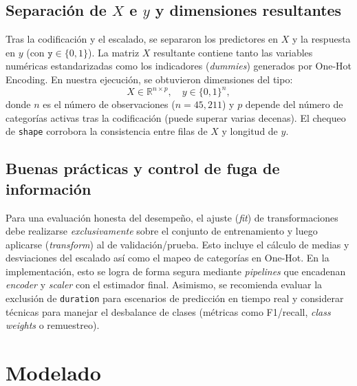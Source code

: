 \documentclass[10pt]{article}
\begin{document}
\subsection*{Separación de \(X\) e \(y\) y dimensiones resultantes}
Tras la codificación y el escalado, se separaron los predictores en \(X\) y la respuesta en \(y\) (con \(\texttt{y}\in\{0,1\}\)). La matriz \(X\) resultante contiene tanto las variables numéricas estandarizadas como los indicadores (\emph{dummies}) generados por One-Hot Encoding. En nuestra ejecución, se obtuvieron dimensiones del tipo:
\[
X \in \mathbb{R}^{n \times p},\quad y \in \{0,1\}^{n},
\]
donde \(n\) es el número de observaciones (\(n=45{,}211\)) y \(p\) depende del número de categorías activas tras la codificación (puede superar varias decenas). El chequeo de \texttt{shape} corrobora la consistencia entre filas de \(X\) y longitud de \(y\).

\subsection*{Buenas prácticas y control de fuga de información}
Para una evaluación honesta del desempeño, el ajuste (\emph{fit}) de transformaciones debe realizarse \emph{exclusivamente} sobre el conjunto de entrenamiento y luego aplicarse (\emph{transform}) al de validación/prueba. Esto incluye el cálculo de medias y desviaciones del escalado así como el mapeo de categorías en One-Hot. En la implementación, esto se logra de forma segura mediante \emph{pipelines} que encadenan \textit{encoder} y \textit{scaler} con el estimador final. Asimismo, se recomienda evaluar la exclusión de \texttt{duration} para escenarios de predicción en tiempo real y considerar técnicas para manejar el desbalance de clases (métricas como F1/recall, \emph{class weights} o remuestreo).



\section{Modelado}
\end{document}
